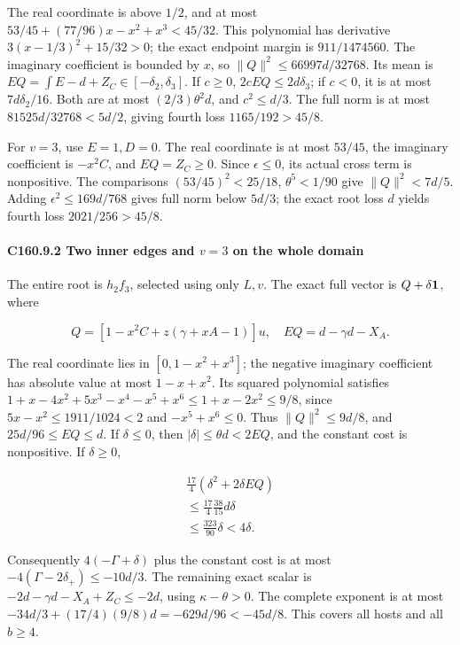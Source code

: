 The real coordinate is above \(1/2\), and at most \(53/45+(77/96)x-x^2+x^3<45/32\). This polynomial has derivative \(3(x-1/3)^2+15/32>0\); the exact endpoint margin is \(911/1474560\). The imaginary coefficient is bounded by \(x\), so \(\|Q\|^2\le66997d/32768\). Its mean is \(EQ=\int E-d+Z_C\in[-\delta_2,\allowbreak \allowbreak  \delta_3]\). If \(c\ge0\), \(2cEQ\le2d\delta_3\); if \(c<0\), it is at most \(7d\delta_2/16\). Both are at most \((2/3)\theta^2d\), and \(c^2\le d/3\). The full norm is at most \(81525d/32768<5d/2\), giving fourth loss \(1165/192>45/8\).

For \(v=3\), use \(E=1,\allowbreak \allowbreak  D=0\). The real coordinate is at most \(53/45\), the imaginary coefficient is \(-x^2C\), and \(EQ=Z_C\ge0\). Since \(\epsilon\le0\), its actual cross term is nonpositive. The comparisons \((53/45)^2<25/18\), \(\theta^5<1/90\) give \(\|Q\|^2<7d/5\). Adding \(\epsilon^2\le169d/768\) gives full norm below \(5d/3\); the exact root loss \(d\) yields fourth loss \(2021/256>45/8\).

\paragraph{C160.9.2 Two inner edges and \(v=3\) on the whole domain}

The entire root is \(h_2f_3\), selected using only \(L,\allowbreak \allowbreak  v\). The exact full vector is \(Q+\delta\mathbf1\), where

\[
Q=[1-x^2C+z(\gamma+xA-1)]u,
\quad EQ=d-\gamma d-X_A.
\]

The real coordinate lies in \([0,\allowbreak \allowbreak  1-x^2+x^3]\); the negative imaginary coefficient has absolute value at most \(1-x+x^2\). Its squared polynomial satisfies \(1+x-4x^2+5x^3-x^4-x^5+x^6\le1+x-2x^2\le9/8\), since \(5x-x^2\le1911/1024<2\) and \(-x^5+x^6\le0\). Thus \(\|Q\|^2\le9d/8\), and \(25d/96\le EQ\le d\). If \(\delta\le0\), then \(|\delta|\le\theta d<2EQ\), and the constant cost is nonpositive. If \(\delta\ge0\),

\[
\begin{gathered}
\tfrac{17}4(\delta^2+2\delta EQ)\\
\le\tfrac{17}4\tfrac{38}{15}d\delta\\
\le\tfrac{323}{90}\delta<4\delta.
\end{gathered}
\]

Consequently \(4(-\Gamma+\delta)\) plus the constant cost is at most \(-4(\Gamma-2\delta_+)\le-10d/3\). The remaining exact scalar is \(-2d-\gamma d-X_A+Z_C\le-2d\), using \(\kappa-\theta>0\). The complete exponent is at most \(-34d/3+(17/4)(9/8)d=-629d/96<-45d/8\). This covers all hosts and all \(b\ge4\).

